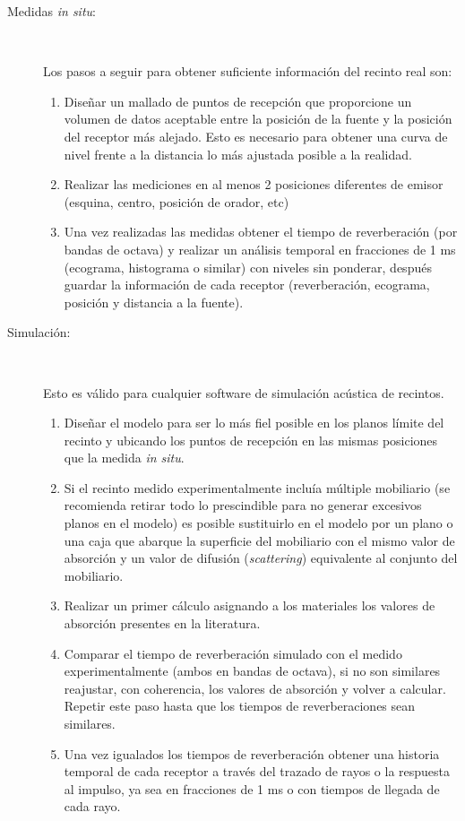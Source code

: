 \begin{description}
  \item[Medidas \textit{in situ}:]~
  
  Los pasos a seguir para obtener suficiente información del recinto real son:
  \begin{enumerate}
  \item Diseñar un mallado de puntos de recepción que proporcione un volumen de datos aceptable entre la posición de la fuente y la posición del receptor más alejado. Esto es necesario para obtener una curva de nivel frente a la distancia lo más ajustada posible a la realidad.
  \item Realizar las mediciones en al menos 2 posiciones diferentes de emisor (esquina, centro, posición de orador, etc)
  \item Una vez realizadas las medidas obtener el tiempo de reverberación (por bandas de octava) y realizar un análisis temporal en fracciones de 1 ms (ecograma, histograma o similar) con niveles sin ponderar, después guardar la información de cada receptor (reverberación, ecograma, posición y distancia a la fuente).
\end{enumerate}

\item[Simulación:]~

Esto es válido para cualquier software de simulación acústica de recintos.

\begin{enumerate}
  \item Diseñar el modelo para ser lo más fiel posible en los planos límite del recinto y ubicando los puntos de recepción en las mismas posiciones que la medida \textit{in situ}.
  \item Si el recinto medido experimentalmente incluía múltiple mobiliario (se recomienda retirar todo lo prescindible para no generar excesivos planos en el modelo) es posible sustituirlo en el modelo por un plano o una caja que abarque la superficie del mobiliario con el mismo valor de absorción y un valor de difusión (\textit{scattering}) equivalente al conjunto del mobiliario.
  \item Realizar un primer cálculo asignando a los materiales los valores de absorción presentes en la literatura.
  \item Comparar el tiempo de reverberación simulado con el medido experimentalmente (ambos en bandas de octava), si no son similares reajustar, con coherencia, los valores de absorción y volver a calcular. Repetir este paso hasta que los tiempos de reverberaciones sean similares.
  \item Una vez igualados los tiempos de reverberación obtener una historia temporal de cada receptor a través del trazado de rayos o la respuesta al impulso, ya sea en fracciones de 1 ms o con tiempos de llegada de cada rayo.
\end{enumerate}


\end{description}
